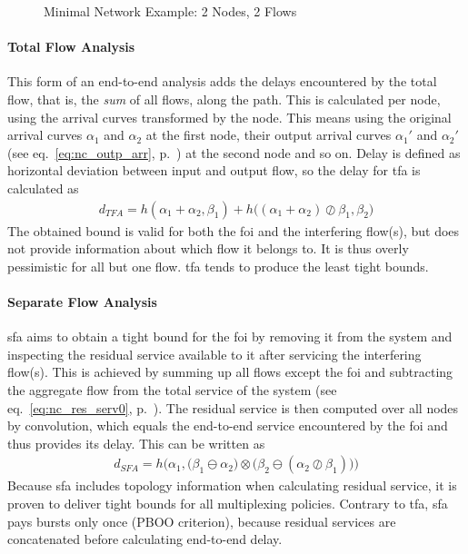 \begin{figure}[H]
  \centering
  \def\svgwidth{0.6\textwidth}
  
  \caption{Minimal Network Example: 2 Nodes, 2 Flows}
  \label{fig:nc_basics_minnet}
\end{figure}


\paragraph{Total Flow Analysis}
This form of an end-to-end analysis adds the delays encountered by the total flow, that is, the \emph{sum} of all flows, along the path.
This is calculated per node, using the arrival curves transformed by the node. This means using the original arrival curves $\alpha_1$ and $\alpha_2$ at the first node, their output arrival curves
$\alpha_1'$ and $\alpha_2'$ (see eq.~\ref{eq:nc_outp_arr}, p.~\pageref{eq:nc_outp_arr}) at the second node and so on.
Delay is defined as horizontal deviation between input and output flow, so the delay for \gls{tfa} is calculated as
%
\begin{align}
d_{TFA} = h(\alpha_1 + \alpha_2, \beta_1) + h \big( (\alpha_1 + \alpha_2) \oslash \beta_1, \beta_2 \big) 
\label{eq:d_tfa}
\end{align}
%
The obtained bound is valid for both the \gls{foi} and the interfering flow(s), but does not provide information about which flow it belongs to. It is thus overly pessimistic for all but one flow.
\gls{tfa} tends to produce the least tight bounds.

\paragraph{Separate Flow Analysis}
\gls{sfa} aims to obtain a tight bound for the \gls{foi} by removing it from the system and inspecting the residual service available to it after servicing the interfering flow(s). 
This is achieved by summing up all flows except the \gls{foi} and subtracting
the aggregate flow from the total service of the system (see eq.~\ref{eq:nc_res_serv0}, p.~\pageref{eq:nc_res_serv0}). The residual service is then computed over all nodes by convolution,
which equals the end-to-end service encountered by the \gls{foi} and thus provides its delay. This can be written as
%
\begin{align}
d_{SFA} = h\Big(\alpha_1, \big(\beta_1 \ominus \alpha_2 \big) \otimes \big(\beta_2 \ominus (\alpha_2 \oslash \beta_1) \big) \Big) 
\label{eq:d_sfa}
\end{align}
%
Because \gls{sfa} includes topology information when calculating residual service, it is proven to deliver tight bounds for all multiplexing policies. Contrary to \gls{tfa},  \gls{sfa} pays bursts only once (PBOO criterion), because residual services are concatenated
before calculating end-to-end delay.

